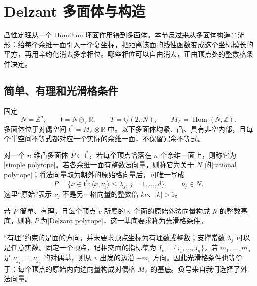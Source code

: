 
% 
% 

\section{Delzant 多面体与构造}
\label{g4:sec:1203}

凸性定理从一个 Hamilton 环面作用得到多面体。本节反过来从多面体构造辛流形：给每个余维一面引入一个复坐标，把距离该面的线性函数变成这个坐标模长的平方，再用辛约化消去多余相位。哪些相位可以自由消去，正由顶点处的整数格条件决定。

\subsection{简单、有理和光滑格条件}
\label{g4:subsec:1203:01}

固定
\[
	N=\mathbb Z^n,\qquad
	\mathfrak t=N\otimes_{\mathbb Z}\mathbb R,\qquad
	T=\mathfrak t/(2\pi N),\qquad
	M_{\mathbb Z}=\operatorname{Hom}(N,\mathbb Z).
\]
多面体位于对偶空间 \(\mathfrak t^*=M_{\mathbb Z}\otimes\mathbb R\) 中。以下多面体均紧、凸、具有非空内部，且每个半空间不等式都对应一个实际的余维一面，不保留冗余不等式。

\begin{definition}\label{g4:def:1203:delzant-polytope}
	对一个 \(n\) 维凸多面体 \(P\subset\mathfrak t^*\)，若每个顶点恰落在 \(n\) 个余维一面上，则称它为[simple polytope]。若各余维一面有整数法向量，则称它为关于 \(N\) 的[rational polytope]；将法向量取为朝外的原始格向量后，可唯一写成
	\begin{equation}\label{g4:eq:1203:facet-presentation}
		P=\{x\in\mathfrak t^*:\langle x,\nu_j\rangle\le\lambda_j,\
		j=1,\ldots,d\},\qquad \nu_j\in N.
	\end{equation}
	这里“原始”表示 \(\nu_j\) 不是另一格向量的整数倍 \(k\nu\)、\(|k|>1\)。

	若 \(P\) 简单、有理，且每个顶点 \(v\) 所属的 \(n\) 个面的原始外法向量构成 \(N\) 的整数基底，则称 \(P\) 为[Delzant polytope]，这一基底要求称为光滑格条件。
\end{definition}

“有理”约束的是面的方向，并未要求顶点坐标为有理数或整数；支撑常数 \(\lambda_j\) 可以是任意实数。固定一个顶点，记相交面的指标集为 \(I_v=\{j_1,\ldots,j_n\}\)。若 \(m_1,\ldots,m_n\) 是 \(\nu_{j_1},\ldots,\nu_{j_n}\) 的对偶基，则从 \(v\) 出发的边沿 \(-m_i\) 方向。因此光滑格条件也等价于：每个顶点的原始内向边向量构成对偶格 \(M_{\mathbb Z}\) 的基底。负号来自我们选择了外法向量。


